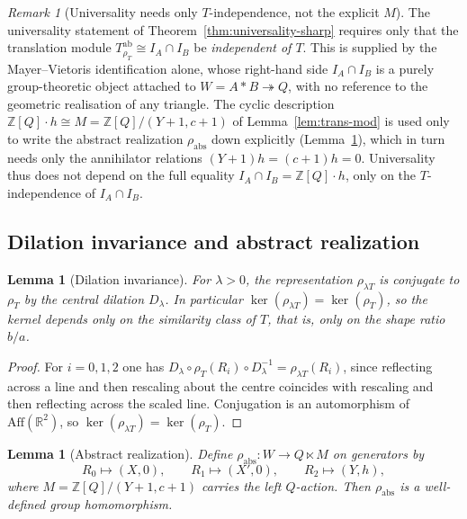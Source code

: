 \documentclass[11pt]{article}
\theoremstyle{plain}
\newtheorem{lemma}[theorem]{Lemma}
\theoremstyle{definition}
\theoremstyle{remark}
\newtheorem{remark}[theorem]{Remark}
\begin{document}
\begin{remark}[Universality needs only $T$-independence, not the
explicit $M$]
\label{rem:univ-robust}
The universality statement of Theorem~\ref{thm:universality-sharp} requires
only that the translation module
$T_{\rho_T}^{\mathrm{ab}} \cong I_A \cap I_B$ be \emph{independent of
$T$}.  This is supplied by the Mayer--Vietoris identification alone,
whose right-hand side $I_A \cap I_B$ is a purely group-theoretic object
attached to $W = A * B \twoheadrightarrow Q$, with no reference to the
geometric realisation of any triangle.  The cyclic description
$\mathbb{Z}[Q]\cdot h \cong M = \mathbb{Z}[Q]/(Y+1, c+1)$ of
Lemma~\ref{lem:trans-mod} is used only to write the abstract
realization $\rho_{\mathrm{abs}}$ down explicitly
(Lemma~\ref{lem:rho-abs}), which in turn needs only the annihilator
relations $(Y+1)h = (c+1)h = 0$.  Universality thus does not depend on
the full equality $I_A \cap I_B = \mathbb{Z}[Q]\cdot h$, only on the
$T$-independence of $I_A \cap I_B$.
\end{remark}

\subsection{Dilation invariance and abstract realization}

\begin{lemma}[Dilation invariance]
\label{lem:dilation-invariance}
For $\lambda > 0$, the representation $\rho_{\lambda T}$ is conjugate to
$\rho_T$ by the central dilation $D_\lambda$.  In particular
$\ker(\rho_{\lambda T}) = \ker(\rho_T)$, so the kernel depends only on
the similarity class of $T$, that is, only on the shape ratio $b/a$.
\end{lemma}

\begin{proof}
For $i = 0, 1, 2$ one has
$D_\lambda \circ \rho_T(R_i) \circ D_\lambda^{-1} =
\rho_{\lambda T}(R_i)$, since reflecting across a line and then
rescaling about the centre coincides with rescaling and then reflecting
across the scaled line.  Conjugation is an automorphism of
$\mathrm{Aff}(\mathbb{R}^2)$, so
$\ker(\rho_{\lambda T}) = \ker(\rho_T)$.
\end{proof}

\begin{lemma}[Abstract realization]
\label{lem:rho-abs}
Define $\rho_{\mathrm{abs}} \colon W \to Q \ltimes M$ on generators by
\[
R_0 \mapsto (X, 0),
\qquad
R_1 \mapsto (X', 0),
\qquad
R_2 \mapsto (Y, h),
\]
where $M = \mathbb{Z}[Q]/(Y+1, c+1)$ carries the left $Q$-action.  Then
$\rho_{\mathrm{abs}}$ is a well-defined group homomorphism.
\end{lemma}
\end{document}

